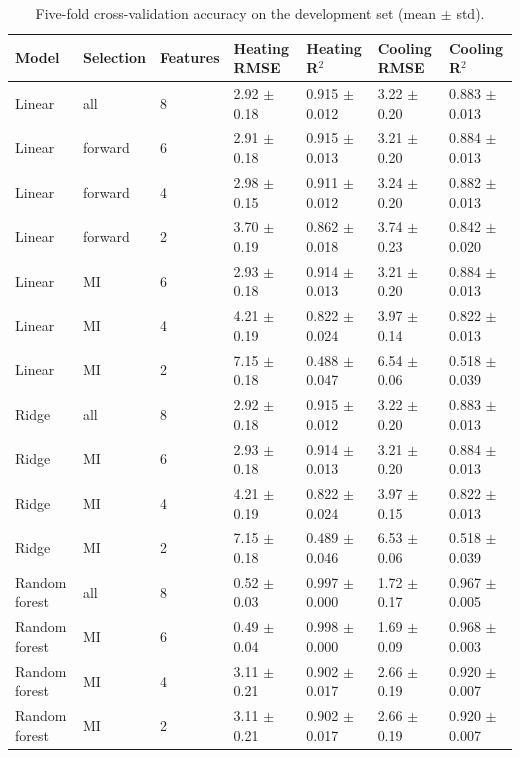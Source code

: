 \begin{table}[t]
\centering
\caption{Five-fold cross-validation accuracy on the development set (mean $\pm$ std).}
\label{tab:cv_accuracy}
\begin{tabular}{lllllll}
\toprule
Model & Selection & Features & Heating RMSE & Heating R$^2$ & Cooling RMSE & Cooling R$^2$ \\
\midrule
Linear & all & 8 & 2.92 $\pm$ 0.18 & 0.915 $\pm$ 0.012 & 3.22 $\pm$ 0.20 & 0.883 $\pm$ 0.013 \\
Linear & forward & 6 & 2.91 $\pm$ 0.18 & 0.915 $\pm$ 0.013 & 3.21 $\pm$ 0.20 & 0.884 $\pm$ 0.013 \\
Linear & forward & 4 & 2.98 $\pm$ 0.15 & 0.911 $\pm$ 0.012 & 3.24 $\pm$ 0.20 & 0.882 $\pm$ 0.013 \\
Linear & forward & 2 & 3.70 $\pm$ 0.19 & 0.862 $\pm$ 0.018 & 3.74 $\pm$ 0.23 & 0.842 $\pm$ 0.020 \\
Linear & MI & 6 & 2.93 $\pm$ 0.18 & 0.914 $\pm$ 0.013 & 3.21 $\pm$ 0.20 & 0.884 $\pm$ 0.013 \\
Linear & MI & 4 & 4.21 $\pm$ 0.19 & 0.822 $\pm$ 0.024 & 3.97 $\pm$ 0.14 & 0.822 $\pm$ 0.013 \\
Linear & MI & 2 & 7.15 $\pm$ 0.18 & 0.488 $\pm$ 0.047 & 6.54 $\pm$ 0.06 & 0.518 $\pm$ 0.039 \\
Ridge & all & 8 & 2.92 $\pm$ 0.18 & 0.915 $\pm$ 0.012 & 3.22 $\pm$ 0.20 & 0.883 $\pm$ 0.013 \\
Ridge & MI & 6 & 2.93 $\pm$ 0.18 & 0.914 $\pm$ 0.013 & 3.21 $\pm$ 0.20 & 0.884 $\pm$ 0.013 \\
Ridge & MI & 4 & 4.21 $\pm$ 0.19 & 0.822 $\pm$ 0.024 & 3.97 $\pm$ 0.15 & 0.822 $\pm$ 0.013 \\
Ridge & MI & 2 & 7.15 $\pm$ 0.18 & 0.489 $\pm$ 0.046 & 6.53 $\pm$ 0.06 & 0.518 $\pm$ 0.039 \\
Random forest & all & 8 & 0.52 $\pm$ 0.03 & 0.997 $\pm$ 0.000 & 1.72 $\pm$ 0.17 & 0.967 $\pm$ 0.005 \\
Random forest & MI & 6 & 0.49 $\pm$ 0.04 & 0.998 $\pm$ 0.000 & 1.69 $\pm$ 0.09 & 0.968 $\pm$ 0.003 \\
Random forest & MI & 4 & 3.11 $\pm$ 0.21 & 0.902 $\pm$ 0.017 & 2.66 $\pm$ 0.19 & 0.920 $\pm$ 0.007 \\
Random forest & MI & 2 & 3.11 $\pm$ 0.21 & 0.902 $\pm$ 0.017 & 2.66 $\pm$ 0.19 & 0.920 $\pm$ 0.007 \\
\bottomrule
\end{tabular}
\end{table}
